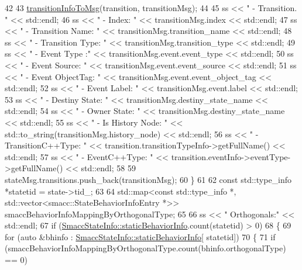 \begin{DoxyCode}
42 
43             \hyperlink{namespacesmacc_1_1introspection_a6c1b51c4d44fd5e41fe218f1ee150681}{transitionInfoToMsg}(transition, transitionMsg);
44 
45             ss << \textcolor{stringliteral}{" - Transition.  "} << std::endl;
46             ss << \textcolor{stringliteral}{"      - Index: "} << transitionMsg.index << std::endl;
47             ss << \textcolor{stringliteral}{"      - Transition Name: "} << transitionMsg.transition\_name << std::endl;
48             ss << \textcolor{stringliteral}{"      - Transition Type: "} << transitionMsg.transition\_type << std::endl;
49             ss << \textcolor{stringliteral}{"      - Event Type :"} << transitionMsg.event.event\_type << std::endl;
50             ss << \textcolor{stringliteral}{"      - Event Source: "} << transitionMsg.event.event\_source << std::endl;
51             ss << \textcolor{stringliteral}{"      - Event ObjectTag: "} << transitionMsg.event.event\_object\_tag << std::endl;
52             ss << \textcolor{stringliteral}{"      - Event Label: "} << transitionMsg.event.label << std::endl;
53             ss << \textcolor{stringliteral}{"      - Destiny State: "} << transitionMsg.destiny\_state\_name << std::endl;
54             ss << \textcolor{stringliteral}{"      - Owner State: "} << transitionMsg.destiny\_state\_name << std::endl;
55             ss << \textcolor{stringliteral}{"      - Is History Node: "} << std::to\_string(transitionMsg.history\_node) << std::endl;
56             ss << \textcolor{stringliteral}{"      - TransitionC++Type: "} << transition.transitionTypeInfo->getFullName() << 
      std::endl;
57             ss << \textcolor{stringliteral}{"      - EventC++Type: "} << transition.eventInfo->eventType->getFullName() << std::endl;
58 
59             stateMsg.transitions.push\_back(transitionMsg);
60         \}
61 
62         \textcolor{keyword}{const} std::type\_info *statetid = state->tid\_;
63 
64         std::map<const std::type\_info *, std::vector<smacc::StateBehaviorInfoEntry *>> 
      smaccBehaviorInfoMappingByOrthogonalType;
65 
66         ss << \textcolor{stringliteral}{" Orthogonals:"} << std::endl;
67         \textcolor{keywordflow}{if} (\hyperlink{classsmacc_1_1introspection_1_1SmaccStateInfo_a2cc62c6c9dec1a4f5294f8430efb71f2}{SmaccStateInfo::staticBehaviorInfo}.count(statetid) > 0)
68         \{
69             \textcolor{keywordflow}{for} (\textcolor{keyword}{auto} &bhinfo : \hyperlink{classsmacc_1_1introspection_1_1SmaccStateInfo_a2cc62c6c9dec1a4f5294f8430efb71f2}{SmaccStateInfo::staticBehaviorInfo}[
      statetid])
70             \{
71                 \textcolor{keywordflow}{if} (smaccBehaviorInfoMappingByOrthogonalType.count(bhinfo.orthogonalType) == 0)

\end{DoxyCode}
